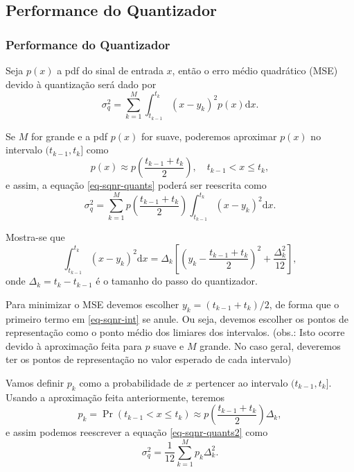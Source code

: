 \subsection{Performance do Quantizador}

\begin{frame}[allowframebreaks]
  \frametitle{Performance do Quantizador}
  Seja $p(x)$ a pdf do sinal de entrada $x$, então o erro médio quadrático (MSE) 
  devido à quantização será dado por
  \begin{equation} \label{eq-sqnr-quants}
  \sigma_q^2 = \sum_{k=1}^{M} \int_{t_{k-1}}^{t_k} (x - y_k)^2 p(x) \mathrm{d}x.
  \end{equation}

  Se $M$ for grande e a pdf $p(x)$ for suave, poderemos aproximar $p(x)$ no intervalo $(t_{k-1},t_{k}]$ como
  \begin{equation}
  p(x) \approx p\left(\frac{t_{k-1}+t_{k}}{2}\right) , \quad t_{k-1} < x \leq t_k ,
  \end{equation}
  e assim, a equação \ref{eq-sqnr-quants} poderá ser reescrita como
  \begin{equation} \label{eq-sqnr-quants2}
  \sigma_q^2 = \sum_{k=1}^{M} p\left(\frac{t_{k-1}+t_{k}}{2}\right) \int_{t_{k-1}}^{t_k} (x - y_k)^2 \mathrm{d}x.
  \end{equation}

  Mostra-se que
  \begin{equation} \label{eq-sqnr-int}
  \int_{t_{k-1}}^{t_k} (x - y_k)^2 \mathrm{d}x = \Delta_k \left[ \left( y_k - \frac{t_{k-1} + t_{k}}{2} \right)^2 + \frac{\Delta_k^2}{12} \right] ,
  \end{equation}
  onde $\Delta_k = t_k - t_{k-1}$ é o tamanho do passo do quantizador.

  Para minimizar o MSE devemos escolher $y_k = (t_{k-1} + t_{k})/2$, 
  de forma que o primeiro termo em \ref{eq-sqnr-int} se anule. Ou seja,
  devemos escolher os pontos de representação como o ponto médio dos limiares dos intervalos.
  (obs.: Isto ocorre devido à aproximação feita para $p$ suave e $M$ grande. No caso geral,
  deveremos ter os pontos de representação no valor esperado de cada intervalo)

  Vamos definir $p_k$ como a probabilidade de $x$ pertencer ao intervalo $(t_{k-1},t_k]$.
  Usando a aproximação feita anteriormente, teremos
  \begin{equation} \label{eq-pk-aprox}
  p_k = \Pr(t_{k-1} < x \leq t_k) \approx p\left(\frac{t_{k-1}+t_{k}}{2}\right) \Delta_k ,
  \end{equation}
  e assim podemos reescrever a equação \ref{eq-sqnr-quants2} como
  \begin{equation} \label{eq-sqnr-quants3}
  \sigma_q^2 = \frac{1}{12} \sum_{k=1}^{M} p_k \Delta_k^2 .
  \end{equation}

\end{frame}



